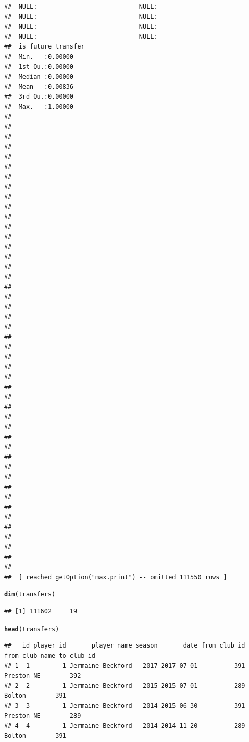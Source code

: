 \documentclass{article}\usepackage[]{graphicx}\usepackage[]{color}
\makeatletter
\newcommand{\hlstd}[1]{\textcolor[rgb]{0.345,0.345,0.345}{#1}}%
\newcommand{\hlkwd}[1]{\textcolor[rgb]{0.737,0.353,0.396}{\textbf{#1}}}%
\newenvironment{kframe}{%
 \def\at@end@of@kframe{}%
 \ifinner\ifhmode%
  \def\at@end@of@kframe{\end{minipage}}%
  \begin{minipage}{\columnwidth}%
 \fi\fi%
 \def\FrameCommand##1{\hskip\@totalleftmargin \hskip-\fboxsep
 \colorbox{shadecolor}{##1}\hskip-\fboxsep
     \hskip-\linewidth \hskip-\@totalleftmargin \hskip\columnwidth}%
 \MakeFramed {\advance\hsize-\width
   \@totalleftmargin\z@ \linewidth\hsize
   \@setminipage}}%
 {\par\unskip\endMakeFramed%
 \at@end@of@kframe}
\newenvironment{knitrout}{}{} %
\makeatother
\begin{document}
\begin{knitrout}
\begin{kframe}
\begin{verbatim}
##  NULL:                            NULL:                                              
##  NULL:                            NULL:                                              
##  NULL:                            NULL:                                              
##  NULL:                            NULL:                                              
##  is_future_transfer
##  Min.   :0.00000   
##  1st Qu.:0.00000   
##  Median :0.00000   
##  Mean   :0.00836   
##  3rd Qu.:0.00000   
##  Max.   :1.00000   
##                    
##                    
##                    
##                    
##                    
##                    
##                    
##                    
##                    
##                    
##                    
##                    
##                    
##                    
##                    
##                    
##                    
##                    
##                    
##                    
##                    
##                    
##                    
##                    
##                    
##                    
##                    
##                    
##                    
##                    
##                    
##                    
##                    
##                    
##                    
##                    
##                    
##                    
##                    
##                    
##                    
##                    
##                    
##                    
##                    
##                    
##  [ reached getOption("max.print") -- omitted 111550 rows ]
\end{verbatim}
\begin{alltt}
\hlkwd{dim}\hlstd{(transfers)}
\end{alltt}
\begin{verbatim}
## [1] 111602     19
\end{verbatim}
\begin{alltt}
\hlkwd{head}\hlstd{(transfers)}
\end{alltt}
\begin{verbatim}
##   id player_id       player_name season       date from_club_id from_club_name to_club_id
## 1  1         1 Jermaine Beckford   2017 2017-07-01          391     Preston NE        392
## 2  2         1 Jermaine Beckford   2015 2015-07-01          289         Bolton        391
## 3  3         1 Jermaine Beckford   2014 2015-06-30          391     Preston NE        289
## 4  4         1 Jermaine Beckford   2014 2014-11-20          289         Bolton        391

\end{verbatim}
\end{kframe}
\end{knitrout}
\end{document}
